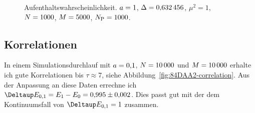 \begin{figure}[htbp]
    \centering
    \caption{%
        Aufenthaltswahrscheinlichkeit. $a =
        \num{1}$, $\Delta = \num{0.632456}$, $\mu^2 = \num{1}$, $N =
        \num{1000}$, $M = \num{5000}$, $N_\text P = \num{1000}$.
    }
    \label{fig:histogram_10}
\end{figure}

\subsection{Korrelationen}

In einem Simulationsdurchlauf mit $a = \num{0.1}$, $N =
\num{10000}$ und $M = \num{10000}$ erhalte ich gute Korrelationen bis
$\tau \approx \num{7}$, siehe Abbildung~\ref{fig:84DAA2-correlation}. Aus der
Anpassung an diese Daten errechne ich $\Deltaup E_{0,1} = E_1 - E_0 = \num{0.995
    +- 0.002}$. Dies passt gut mit der dem Kontinuumsfall von $\Deltaup E_{0,1}
    = \num{1}$ zusammen.

